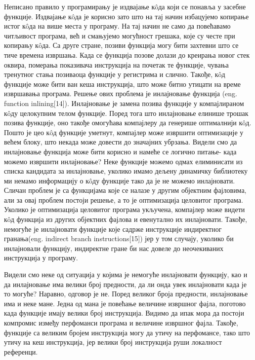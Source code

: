 \documentclass[12pt,oneside]{memoir}
\begin{document}
Неписано правило у програмирању је издвајање к\^{o}да који се понавља у 
засебне функције.
Издвајање к\^{o}да је корисно зато што на тај начин избацујемо копирање
истог к\^{o}да на више места у програму.
На тај начин не само да повећавамо читљивост програма, већ и смањујемо
могућност грешака, које су честе при копирању  к\^{o}да.
Са друге стране, позиви функција могу бити захтевни што се тиче времена извршања.
Када се функција позове долази до креирања новог стек оквира, померања показивача
инструкција на почетак те функције, чувања тренутног стања позиваоца функције у 
регистрима и слично.
Такође,  к\^{o}д функције може бити ван кеша инструкција, што може битно
утицати на време извршавања програма.
Решење ових проблема је инлајновање функција (eng. function inlining[14]).
Инлајновање је замена позива функције у компајлираном к\^{o}ду
целокупним телом функције.
Поред тога што инлајновање елинише трошак позива функције, оно такође
омогућава компајлеру да генерише оптималнији к\^{o}д.
Пошто је цео к\^{o}д функције уметнут, компајлер може извршити оптимизације у већем
блоку, што некада може довести до значајних убрзања.
Видели смо да инлајновање функција може бити корисно и намеће се логично питање-
када можемо извршити инлајновање?
Неке функције можемо одмах елиминисати из списка кандидата за инлајновање, уколико имамо дељену динамичку библиотеку ми немамо
информацију о к\^{o}ду функције тако да је не можемо инлајновати.
Сличан проблем је са функцијама које се налазе у другим објектним фајловима, али за
овај проблем постоји решење, а то је оптимизација целовитог програма.
Уколико је оптимизација целовитог програма укључена, компајлер може видети
к\^{o}д функција из других објектних фајлова и евенутално их инлајновати.
Такође, немогуће је инлајновати функције које садрже инструкције индиректног
гранања(eng. indirect branch instructions[15]) јер у том случају, уколико би 
инлајновали функцију, индиректне гране би нас довеле до неочекиваних инструкција
у програму.
\par 
Видели смо неке од ситуација у којима је немогуће инлајновати функцију, као и да
инлајновање има велики број предности, да ли онда увек инлајновати када је то 
могуће?
Наравно, одговор је не. 
Поред великог броја предности, инлајновање има и неке мане.
Једна од мана је повећање величине извршног фајла, поготово када функције имају
велики број инструкција.
Видимо да ипак мора да постоји компромис између перфоманси програма и величине
извршног фајла.
Такође, функције са великим бројем инструкција могу да утичу на перфомансе, тако
што утичу на кеш инструкција, јер велики број инструкција руши локалност референци. 
\end{document}
